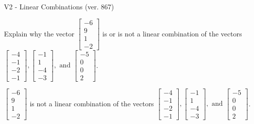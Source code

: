 \begin{exercise}
  \begin{exerciseTitle}V2 - Linear Combinations (ver. 867)\end{exerciseTitle}
  \begin{exerciseStatement}
    Explain why the vector \(\left[\begin{array}{c}
-6 \\
9 \\
1 \\
-2
\end{array}\right]\)  is or is not a linear 
	combination of the vectors \(\left[\begin{array}{c}
-4 \\
-1 \\
-2 \\
-1
\end{array}\right] , \left[\begin{array}{c}
-1 \\
1 \\
-4 \\
-3
\end{array}\right] , \text{ and } \left[\begin{array}{c}
-5 \\
0 \\
0 \\
2
\end{array}\right]\).
	


  \end{exerciseStatement}
  \begin{exerciseAnswer}
   \(\left[\begin{array}{c}
-6 \\
9 \\
1 \\
-2
\end{array}\right]\) 
  	 is not  
	a linear combination of the vectors \(\left[\begin{array}{c}
-4 \\
-1 \\
-2 \\
-1
\end{array}\right] , \left[\begin{array}{c}
-1 \\
1 \\
-4 \\
-3
\end{array}\right] , \text{ and } \left[\begin{array}{c}
-5 \\
0 \\
0 \\
2
\end{array}\right]\).

	
  


  \end{exerciseAnswer}
\end{exercise}